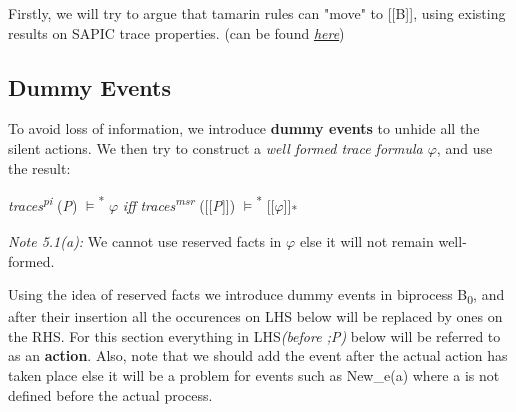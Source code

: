 \documentclass[11pt]{article}
\begin{document}
Firstly, we will try to argue that tamarin rules can "move" to [[B]], using existing results on SAPIC trace properties. (can be found \href{https://hal.archives-ouvertes.fr/hal-01337409v2/document}{\it {here}})\newline
\subsection{Dummy Events}

To avoid loss of information, we introduce {\bf dummy events} to unhide all the silent actions. We then try to construct a {\it well formed trace formula $\varphi$}, and use the result:
\begin{center}
    {\it traces\textsuperscript{pi}} ({\it P}) $\models$\textsuperscript{*} $\varphi$ {\it iff}  {\it traces\textsuperscript{msr}} ([[{\it P}]]) $\models$\textsuperscript{*} [[$\varphi$]]\textsubscript{*}
\end{center}
{\it Note 5.1(a): }We cannot use reserved facts in $\varphi$ else it will not remain well-formed. \newline

Using the idea of reserved facts we introduce dummy events in biprocess B\textsubscript{0}, and after their insertion all the occurences on LHS below will be replaced by ones on the RHS. For this section everything in LHS{\it (before ;P)} below will be referred to as an {\bf action}.\newline 
\hspace*{14pt}Also, note that we should add the event after the actual action has taken place else it will be a problem for events such as New\_e(a) where a is not defined before the actual process.\newline 
\end{document}
